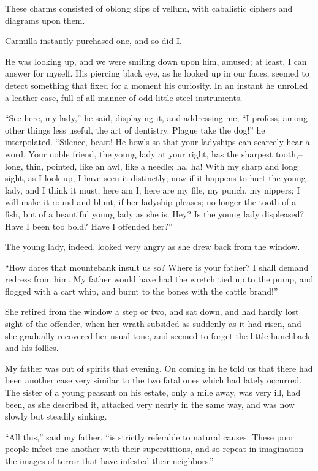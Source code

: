 \documentclass[11pt,twoside,makeidx,hidelinks,]{memoir}
\begin{document}
These charms consisted of oblong slips of vellum, with cabalistic
ciphers and diagrams upon them.

Carmilla instantly purchased one, and so did I.

He was looking up, and we were smiling down upon him, amused; at least,
I can answer for myself. His piercing black eye, as he looked up in our
faces, seemed to detect something that fixed for a moment his curiosity.
In an instant he unrolled a leather case, full of all manner of odd
little steel instruments.

``See here, my lady,'' he said, displaying it, and addressing me, ``I
profess, among other things less useful, the art of dentistry. Plague
take the dog!'' he interpolated. ``Silence, beast! He howls so that your
ladyships can scarcely hear a word. Your noble friend, the young lady at
your right, has the sharpest tooth,--long, thin, pointed, like an awl,
like a needle; ha, ha! With my sharp and long sight, as I look up, I
have seen it distinctly; now if it happens to hurt the young lady, and I
think it must, here am I, here are my file, my punch, my nippers; I will
make it round and blunt, if her ladyship pleases; no longer the tooth of
a fish, but of a beautiful young lady as she is. Hey? Is the young lady
displeased? Have I been too bold? Have I offended her?''

The young lady, indeed, looked very angry as she drew back from the
window.

``How dares that mountebank insult us so? Where is your father? I shall
demand redress from him. My father would have had the wretch tied up to
the pump, and flogged with a cart whip, and burnt to the bones with the
cattle brand!''

She retired from the window a step or two, and sat down, and had hardly
lost sight of the offender, when her wrath subsided as suddenly as it
had risen, and she gradually recovered her usual tone, and seemed to
forget the little hunchback and his follies.

My father was out of spirits that evening. On coming in he told us that
there had been another case very similar to the two fatal ones which had
lately occurred. The sister of a young peasant on his estate, only a
mile away, was very ill, had been, as she described it, attacked very
nearly in the same way, and was now slowly but steadily sinking.

``All this,'' said my father, ``is strictly referable to natural causes.
These poor people infect one another with their superstitions, and so
repeat in imagination the images of terror that have infested their
neighbors.''
\end{document}
